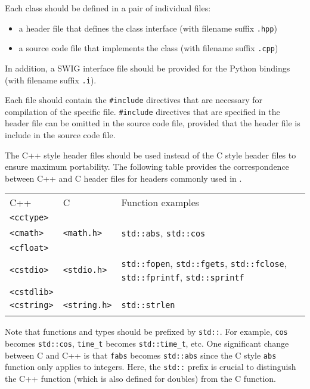 \documentclass{article}[12pt,a4]
\begin{document}
Each class should be defined in a pair of individual files:
\begin{itemize}
\item a header file that defines the class interface (with filename suffix {\tt .hpp})
\item a source code file that implements the class (with filename suffix {\tt .cpp})
\end{itemize}
In addition, a SWIG interface file should be provided for the Python bindings (with filename suffix {\tt .i}).

Each file should contain the {\tt \#include} directives that are necessary for compilation of
the specific file.
{\tt \#include} directives that are specified in the header file can be omitted in the source code
file, provided that the header file is include in the source code file.

The C++ style header files should be used instead of the C style header files to ensure 
maximum portability.
The following table provides the correspondence between C++ and C header files for
headers commonly used in \this.

\begin{center}
\begin{tabular}{lll}
\hline
\hline
\noalign{\smallskip}
C++ & C & Function examples \\
\noalign{\smallskip}
\hline
\noalign{\smallskip}
{\tt <cctype>} & & \\
{\tt <cmath>} & {\tt <math.h>} & {\tt std::abs}, {\tt std::cos} \\
{\tt <cfloat>} & & \\
{\tt <cstdio>} & {\tt <stdio.h>} & {\tt std::fopen}, {\tt std::fgets}, {\tt std::fclose}, {\tt std::fprintf}, {\tt std::sprintf} \\
{\tt <cstdlib>} & & \\
{\tt <cstring>} & {\tt <string.h>} & {\tt std::strlen} \\
\noalign{\smallskip}
\hline
\end{tabular}
\end{center}

Note that functions and types should be prefixed by {\tt std::}.
For example,
{\tt cos} becomes {\tt std::cos},
{\tt time\_t} becomes {\tt std::time\_t}, etc.
One significant change between C and C++ is that {\tt fabs} becomes {\tt std::abs} since
the C style {\tt abs} function only applies to integers.
Here, the {\tt std::} prefix is crucial to distinguish the C++ function (which is
also defined for doubles) from the C function.
\end{document}
